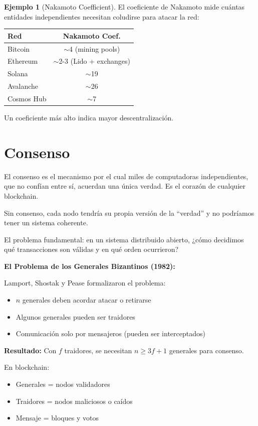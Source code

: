 \documentclass[11pt,a4paper,twoside,openright]{book}
\theoremstyle{definition}
\newtheorem{example}{Ejemplo}[chapter]
\theoremstyle{plain}
\theoremstyle{remark}
\begin{document}
\begin{example}[Nakamoto Coefficient]
El coeficiente de Nakamoto mide cuántas entidades independientes necesitan coludirse para atacar la red:

\begin{center}
\begin{tabular}{lc}
\toprule
\textbf{Red} & \textbf{Nakamoto Coef.} \\
\midrule
Bitcoin & $\sim$4 (mining pools) \\
Ethereum & $\sim$2-3 (Lido + exchanges) \\
Solana & $\sim$19 \\
Avalanche & $\sim$26 \\
Cosmos Hub & $\sim$7 \\
\bottomrule
\end{tabular}
\end{center}

Un coeficiente más alto indica mayor descentralización.
\end{example}

\section{Consenso}

\begin{intuicion}
El consenso es el mecanismo por el cual miles de computadoras independientes, que no confían entre sí, acuerdan una única verdad. Es el corazón de cualquier blockchain.

Sin consenso, cada nodo tendría su propia versión de la ``verdad'' y no podríamos tener un sistema coherente.

El problema fundamental: en un sistema distribuido abierto, ¿cómo decidimos qué transacciones son válidas y en qué orden ocurrieron?
\end{intuicion}

\begin{mathnote}
\textbf{El Problema de los Generales Bizantinos (1982):}

Lamport, Shostak y Pease formalizaron el problema:
\begin{itemize}
    \item $n$ generales deben acordar atacar o retirarse
    \item Algunos generales pueden ser traidores
    \item Comunicación solo por mensajeros (pueden ser interceptados)
\end{itemize}

\textbf{Resultado:} Con $f$ traidores, se necesitan $n \geq 3f + 1$ generales para consenso.

En blockchain:
\begin{itemize}
    \item Generales = nodos validadores
    \item Traidores = nodos maliciosos o caídos
    \item Mensaje = bloques y votos
\end{itemize}
\end{mathnote}
\end{document}
